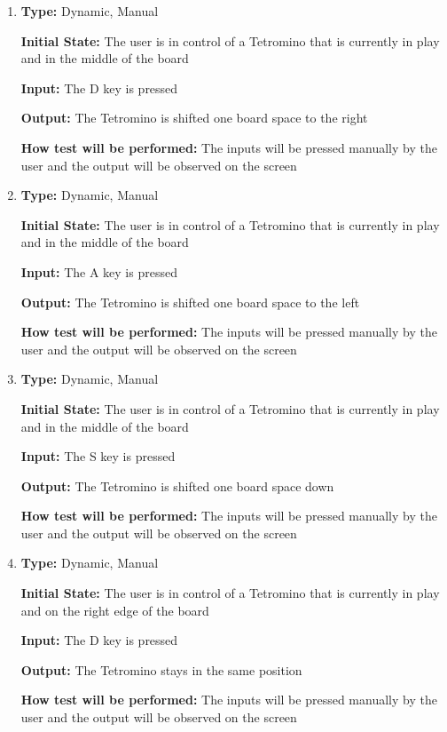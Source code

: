 \documentclass[12pt, titlepage]{article}
\begin{document}
	\begin{enumerate}[{FR-CI-}1. ]
		\item
		\textbf{Type:} Dynamic, Manual
		
		\textbf{Initial State:} The user is in control of a Tetromino that is currently in play and in the middle of the board
		
		\textbf{Input:} The D key is pressed 
		
		\textbf{Output:} The Tetromino is shifted one board space to the right
		
		\textbf{How test will be performed:} The inputs will be pressed manually by the user and the output will be observed on the screen
		
		\item
		\textbf{Type:} Dynamic, Manual
		
		\textbf{Initial State:} The user is in control of a Tetromino that is currently in play and in the middle of the board
		
		\textbf{Input:} The A key is pressed 
		
		\textbf{Output:} The Tetromino is shifted one board space to the left
		
		\textbf{How test will be performed:} The inputs will be pressed manually by the user and the output will be observed on the screen
		
		\item
		\textbf{Type:} Dynamic, Manual
		
		\textbf{Initial State:} The user is in control of a Tetromino that is currently in play and in the middle of the board
		
		\textbf{Input:} The S key is pressed 
		
		\textbf{Output:} The Tetromino is shifted one board space down
		
		\textbf{How test will be performed:} The inputs will be pressed manually by the user and the output will be observed on the screen
		
		\item
		\textbf{Type:} Dynamic, Manual
		
		\textbf{Initial State:} The user is in control of a Tetromino that is currently in play and on the right edge of the board
		
		\textbf{Input:} The D key is pressed 
		
		\textbf{Output:} The Tetromino stays in the same position
		
		\textbf{How test will be performed:} The inputs will be pressed manually by the user and the output will be observed on the screen
		

\end{enumerate}
\end{document}
